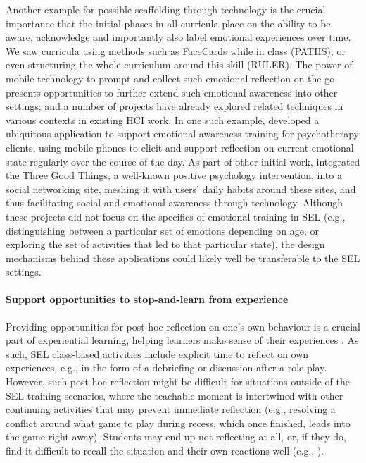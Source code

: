 \documentclass[prodmode,acmtochi]{acmsmall}
\begin{document}
Another example for possible scaffolding through technology is the crucial importance that the initial phases in all curricula place on the ability to be aware, acknowledge and importantly also label emotional experiences over time. We saw curricula using methods such as FaceCards while in class (PATHS); or even structuring the whole curriculum around this skill (RULER). The power of mobile technology to prompt and collect such emotional reflection on-the-go presents opportunities to further extend such emotional awareness into other settings; and a number of projects have already explored related techniques in various contexts in existing HCI work. In one such example,  developed a ubiquitous application to support emotional awareness training  for psychotherapy clients, using mobile phones to elicit and support reflection on current emotional state regularly over the course of the day. As part of other initial work,  integrated the Three Good Things, a well-known positive psychology intervention, into a social networking site, meshing it with users' daily habits around these sites, and thus facilitating social and emotional awareness through technology. 
%
Although these projects did not focus on the specifics of emotional training in SEL (e.g., distinguishing between a particular set of emotions depending on age, or exploring the set of activities that led to that particular state), the design mechanisms behind these applications could likely well be transferable to the SEL settings. 

\paragraph{Support opportunities to stop-and-learn from experience}
Providing opportunities for post-hoc reflection on one's own behaviour is a crucial part of experiential learning, helping learners make sense of their experiences
 \cite{Moon1999,Cohen2001}. As such, SEL class-based activities include explicit time to reflect on own experiences, e.g., in the form of a debriefing or discussion after a role play. However, such post-hoc reflection might be difficult for situations outside of the SEL training scenarios, where the teachable moment is intertwined with other continuing activities that may prevent immediate reflection (e.g., resolving a conflict around what game to play during recess, which once finished, leads into the game right away). Students may end up not reflecting at all, or, if they do, find it difficult to recall the situation and their own reactions well (e.g., \cite[p. 55]{Pasi2001}).
\end{document}
